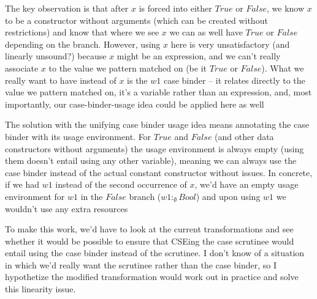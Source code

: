 \documentclass[a4paper, draft]{article}
\begin{document}
\begin{code}
The key observation is that after $x$ is forced into either $True$ or $False$,
we know $x$ to be a constructor without arguments (which can be created
without restrictions) and know that where we see $x$ we can as well have
$True$ or $False$ depending on the branch. However, using $x$ here is very
unsatisfactory (and linearly unsound?) because $x$ might be an expression, and
we can't really associate $x$ to the value we pattern matched on (be it $True$
or $False$). What we really want to have instead of $x$ is the $w1$ case binder --
it relates directly to the value we pattern matched on, it's a variable rather
than an expression, and, most importantly, our case-binder-usage idea could be
applied here as well


The solution with the unifying case binder usage idea means annotating the case
binder with its usage environment. For $True$ and $False$ (and other data
constructors without arguments) the usage environment is always empty (using
them doesn't entail using any other variable), meaning we can always use the
case binder instead of the actual constant constructor without issues.
%
In concrete, if we had $w1$ instead of the second occurrence of $x$, we'd have
an empty usage environment for $w1$ in the $False$ branch ($w1 :_\emptyset
Bool$) and upon using $w1$ we wouldn't use any extra resources


To make this work, we'd have to look at the current transformations and see
whether it would be possible to ensure that CSEing the case scrutinee would
entail using the case binder instead of the scrutinee. I don't know of a
situation in which we'd really want the scrutinee rather than the case binder,
so I hypothetize the modified transformation would work out in practice and
solve this linearity issue.




\end{code}
\end{document}
